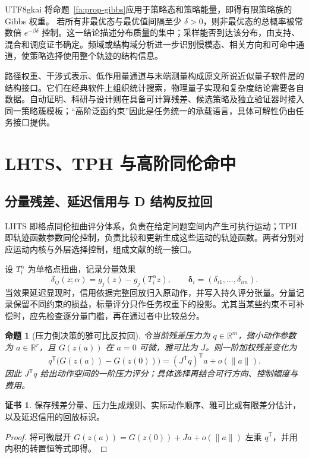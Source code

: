 \documentclass[11pt,a4paper]{article}
\theoremstyle{plain}
\newtheorem{proposition}[theorem]{命题}
\theoremstyle{definition}
\newtheorem*{certificate}{证书}
\theoremstyle{remark}
\begin{document}
\begin{CJK*}{UTF8}{gkai}
将命题~\ref{fa:prop-gibbs}应用于策略态和策略能量，即得有限策略族的 Gibbs 权重。
若所有非最优态与最优值间隔至少 $\delta>0$，则非最优态的总概率被常数倍 $e^{-\beta\delta}$ 控制。这一结论描述分布质量的集中；采样能否到达该分布，由支持、混合和调度证书确定。频域或结构域分析进一步识别慢模态、相关方向和可命中通道，使策略选择使用整个轨迹的结构信息。

路径权重、干涉式表示、低作用量通道与末端测量构成原文所说近似量子软件层的结构接口。它们在经典软件上组织统计搜索，物理量子实现和复杂度结论需要各自数据。自动证明、科研与设计则在具备可计算残差、候选策略及独立验证器时接入同一策略簇模板；“高阶泛函约束”因此是任务统一的承载语言，具体可解性仍由任务接口提供。

\section{LHTS、TPH 与高阶同伦命中}
\label{ss:hitting}

\subsection{分量残差、延迟信用与 D 结构反拉回}

LHTS 即格点同伦扭曲评分体系，负责在给定问题空间内产生可执行运动；TPH 即轨迹函数参数同伦控制，负责比较和更新生成这些运动的轨迹函数。两者分别对应运动内核与外层选择控制，组成文献\cite{S34,S35}的统一接口。

设 $T_i^\alpha$ 为单格点扭曲，记录分量效果
\[
 \delta_{ij}(z;\alpha)=g_j(z)-g_j(T_i^\alpha z),
 \qquad \boldsymbol\delta_i=(\delta_{i1},\ldots,\delta_{im}).
\]
当效果延迟显现时，信用依据完整回放归入原动作，并写入持久评分张量。分量记录保留不同约束的损益，标量评分只作任务权重下的投影。尤其当某些约束不可补偿时，应先检查逐分量门槛，再在通过者中比较总分。

\begin{proposition}[压力倒决策的雅可比反拉回]
\label{ss:pressure}
令当前残差压力为 $q\in\mathbb R^m$，微小动作参数为 $a\in\mathbb R^r$，且 $G(z(a))$ 在 $a=0$ 可微，雅可比为 $J$。则一阶加权残差变化为
\[
 q^{\mathsf T}\bigl(G(z(a))-G(z(0))\bigr)
 =(J^{\mathsf T}q)^{\mathsf T}a+o(\|a\|).
\]
因此 $J^{\mathsf T}q$ 给出动作空间的一阶压力评分；具体选择再结合可行方向、控制幅度与费用。
\end{proposition}
\begin{certificate}
保存残差分量、压力生成规则、实际动作顺序、雅可比或有限差分估计，以及延迟信用的回放标识。
\end{certificate}
\begin{proof}
将可微展开 $G(z(a))=G(z(0))+Ja+o(\|a\|)$ 左乘 $q^{\mathsf T}$，并用内积的转置恒等式即得。
\end{proof}


\end{CJK*}
\end{document}
